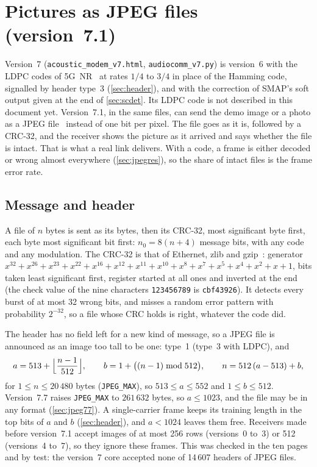 \documentclass[11pt,a4paper]{article}
\newcommand{\code}[1]{\texttt{#1}}
\newcommand{\nz}{n_{0}}
\theoremstyle{remark}
\begin{document}
\section{Pictures as JPEG files (version~7.1)}
\label{sec:jpeg}
Version~7 (\code{acoustic\_modem\_v7.html}, \code{audiocomm\_v7.py}) is version~6 with the LDPC codes of 5G~NR~\cite{ts38212} at rates $1/4$ to $3/4$ in place of the Hamming code, signalled by header type~3 (\cref{sec:header}), and with the correction of SMAP's soft output given at the end of \cref{sec:scdet}. Its LDPC code is not described in this document yet.
Version~7.1, in the same files, can send the demo image or a photo as a JPEG file~\cite{t81} instead of one bit per pixel.
The file goes as it is, followed by a CRC-32, and the receiver shows the picture as it arrived and says whether the file is intact. That is what a real link delivers. With a code, a frame is either decoded or wrong almost everywhere (\cref{sec:jpegres}), so the share of intact files is the frame error rate.

\subsection{Message and header}
\label{sec:jpeghdr}
A file of $n$ bytes is sent as its bytes, then its CRC-32, most significant byte first, each byte most significant bit first: $\nz = 8(n + 4)$ message bits, with any code and any modulation.
The CRC-32 is that of Ethernet, zlib and gzip~\cite{rfc1952}: generator $x^{32} + x^{26} + x^{23} + x^{22} + x^{16} + x^{12} + x^{11} + x^{10} + x^8 + x^7 + x^5 + x^4 + x^2 + x + 1$, bits taken least significant first, register started at all ones and inverted at the end (the check value of the nine characters \code{123456789} is \code{cbf43926}).
It detects every burst of at most 32 wrong bits, and misses a random error pattern with probability $2^{-32}$, so a file whose CRC holds is right, whatever the code did.

The header has no field left for a new kind of message, so a JPEG file is announced as an image too tall to be one: type~1 (type~3 with LDPC), and
\begin{equation}
a = 513 + \Bigl\lfloor \frac{n - 1}{512} \Bigr\rfloor, \qquad b = 1 + \bigl((n - 1) \bmod 512\bigr), \qquad n = 512\,(a - 513) + b,
\end{equation}
for $1 \le n \le 20\,480$ bytes (\code{JPEG\_MAX}), so $513 \le a \le 552$ and $1 \le b \le 512$. Version~7.7 raises \code{JPEG\_MAX} to $261\,632$ bytes, so $a \le 1023$, and the file may be in any format (\cref{sec:jpeg77}).
A single-carrier frame keeps its training length in the top bits of $a$ and $b$ (\cref{sec:header}), and $a < 1024$ leaves them free.
Receivers made before version~7.1 accept images of at most 256 rows (versions~0 to~3) or 512 (versions~4 to~7), so they ignore these frames. This was checked in the ten pages and by test: the version~7 core accepted none of 14\,607 headers of JPEG files.
\end{document}
